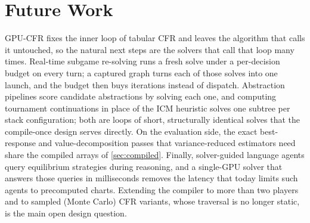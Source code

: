 \section{Future Work}
\label{app:future}

GPU-CFR fixes the inner loop of tabular CFR and leaves the algorithm that calls it
untouched, so the natural next steps are the solvers that call that loop many times.
Real-time subgame re-solving \cite{burch2014solving,li2026real} runs a fresh solve
under a per-decision budget on every turn; a captured graph turns each of those
solves into one launch, and the budget then buys iterations instead of dispatch.
Abstraction pipelines \cite{li2026effective,li2026abstraction} score candidate
abstractions by solving each one, and computing tournament continuations in place of
the ICM heuristic \cite{li2026icm} solves one subtree per stack configuration; both
are loops of short, structurally identical solves that the compile-once design serves
directly. On the evaluation side, the exact best-response and value-decomposition
passes that variance-reduced estimators need \cite{li2026correlated,li2026av,li2026agents}
share the compiled arrays of \cref{sec:compiled}. Finally, solver-guided language
agents \cite{li2026pokerskill,wang2026solver} query equilibrium strategies during
reasoning, and a single-GPU solver that answers those queries in milliseconds removes
the latency that today limits such agents to precomputed charts. Extending the compiler
to more than two players and to sampled (Monte Carlo) CFR variants, whose traversal is
no longer static, is the main open design question.
